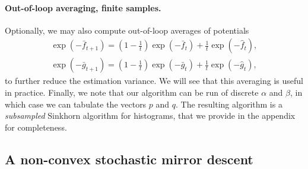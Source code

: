 \paragraph{Out-of-loop averaging, finite samples.} Optionally, we may also
compute out-of-loop averages of potentials
\begin{align}
    \exp(-\bar f_{t+1}) = (1 - \frac{1}{t}) \exp(-\bar f_t) + \frac{1}{t} \exp(-\hat f_t), \\
    \exp(-\bar g_{t+1}) = (1 - \frac{1}{t}) \exp(-\bar g_t) + \frac{1}{t} \exp(-\hat g_t),
\end{align}
to further reduce the estimation variance. We will see that this averaging is
useful in practice. Finally, we note that our algorithm can be run of discrete
$\alpha$ and $\beta$, in which case we can tabulate the vectors $p$ and $q$. The resulting
algorithm is a \textit{subsampled} Sinkhorn algorithm for histograms, that we provide in the
appendix for completeness.


\subsection{A non-convex stochastic mirror descent}
\label{sec-mirror}

